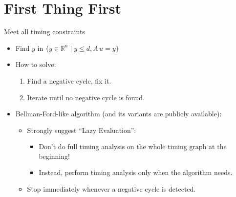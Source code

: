 \documentclass[10pt,ignorenonframetext,mathserif,onlymath]{beamer}
\providecommand{\tightlist}{%
  \setlength{\itemsep}{0pt}\setlength{\parskip}{0pt}}
\begin{document}
\hypertarget{first-thing-first}{%
\section{First Thing First}\label{first-thing-first}}

\begin{frame}{Meet all timing constraints}
\protect\hypertarget{meet-all-timing-constraints}{}

\begin{itemize}
\tightlist
\item
  Find \(y\) in \(\{y \in \mathbb{R}^n \mid y \leq d, A\,u = y\}\)
\item
  How to solve:

  \begin{enumerate}
  [1.]
  \tightlist
  \item
    Find a negative cycle, fix it.
  \item
    Iterate until no negative cycle is found.
  \end{enumerate}
\item
  Bellman-Ford-like algorithm (and its variants are publicly available):

  \begin{itemize}
  \tightlist
  \item
    Strongly suggest “Lazy Evaluation”:

    \begin{itemize}
    \tightlist
    \item
      Don’t do full timing analysis on the whole timing graph at the
      beginning!
    \item
      Instead, perform timing analysis only when the algorithm needs.
    \end{itemize}
  \item
    Stop immediately whenever a negative cycle is detected.
  \end{itemize}
\end{itemize}

\end{frame}
\end{document}

